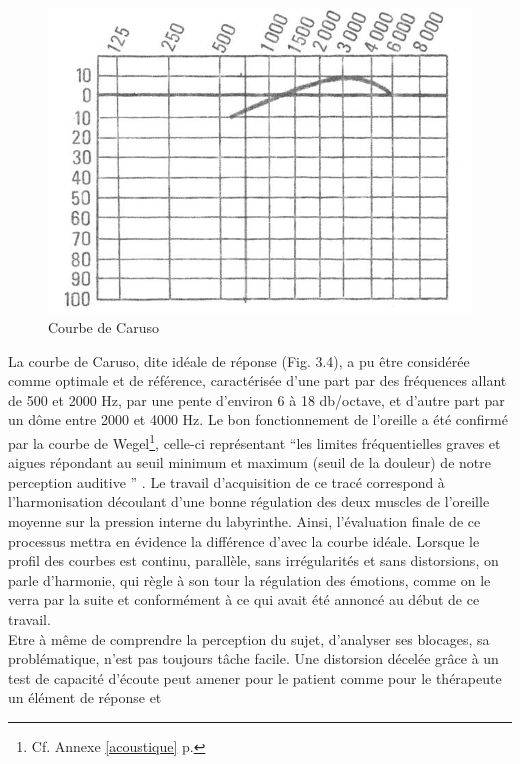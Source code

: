 \begin{center}
	\begin{figure}[h]
		\centering
		\includegraphics[width=0.7\linewidth]{images/graphiques/courbecarusoideale}	
		\caption{Courbe de Caruso \autocite{Tomatislangage} }
	\end{figure}	
\end{center}
La courbe de Caruso, dite idéale de réponse (Fig. 3.4), a pu être considérée comme
optimale et de référence, caractérisée d'une part par des fréquences allant de 500 et 2000
Hz, par une pente d\textquoteright environ 6 à 18 db/octave,
et d'autre part par un dôme entre 2000 et 4000 Hz.
Le bon fonctionnement de l'oreille a été confirmé par la courbe
de Wegel\footnote{Cf. Annexe \ref{acoustique} p. \pageref{acoustique}}, celle-ci représentant   \enquote 
{les limites fréquentielles graves et 
aigues répondant au seuil 
minimum et maximum (seuil de la douleur) de notre perception auditive } 
\autocite{Tomatislangage}.
 Le travail d'acquisition de ce tracé correspond à l'harmonisation
découlant d'une bonne régulation des deux muscles de l'oreille moyenne
sur la pression interne du
labyrinthe.
Ainsi, l'évaluation finale de ce processus mettra en évidence la différence
d'avec la courbe idéale.
Lorsque le profil des
courbes est continu, parallèle, sans irrégularités et sans
distorsions, on parle d'harmonie, qui règle à son tour
la régulation des émotions, comme on le verra par la suite et conformément à
ce qui avait été annoncé au début de ce travail.
 \\
Etre à même de comprendre la perception du sujet, d'analyser ses blocages, sa problématique, 
n'est pas toujours tâche facile.
 Une distorsion décelée grâce à un test 
de capacité d'écoute peut amener pour le patient comme pour le thérapeute un élément de réponse  et 
